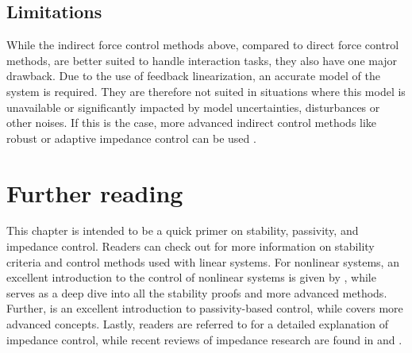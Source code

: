 \subsection{Limitations}

While the indirect force control methods above, compared to direct force control methods, are better suited to handle interaction tasks, they also have one major drawback. Due to the use of feedback linearization, an accurate model of the system is required. They are therefore not suited in situations where this model is unavailable or significantly impacted by model uncertainties, disturbances or other noises. If this is the case, more advanced indirect control methods like robust or adaptive impedance control can be used \cite{songTutorialSurveyComparison2019,khalilNonlinearControl2015,villaniForceControl2016}.

\section{Further reading}

This chapter is intended to be a quick primer on stability, passivity, and impedance control. Readers can check out \cite{bacciottiStabilityControlLinear2019} for more information on stability criteria and control methods used with linear systems. For nonlinear systems, an excellent introduction to the control of nonlinear systems is given by \cite{khalilNonlinearControl2015}, while \cite{khalilNonlinearSystems2002} serves as a deep dive into all the stability proofs and more advanced methods. Further, \cite{baoProcessControlPassive2007} is an excellent introduction to passivity-based control, while \cite{haddadNonlinearDynamicalSystems2011} covers more advanced concepts. Lastly, readers are referred to \cite{sicilianoRoboticsModellingPlanning2010} for a detailed explanation of impedance control, while recent reviews of impedance research are found in \cite{songTutorialSurveyComparison2019} and \cite{al-shukaActiveImpedanceControl2018}.
